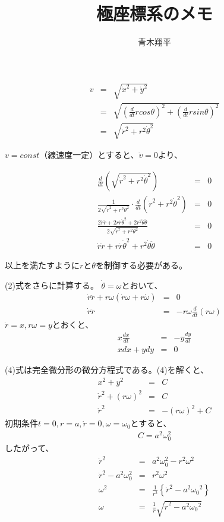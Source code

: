 \documentclass{article}
\title{極座標系のメモ}
\author{青木翔平}
\begin{document}
\maketitle

\begin{eqnarray}
v &=& \sqrt{\dot{x}^2 + \dot{y}^2} \nonumber \\
  &=& \sqrt{ \left(\frac{d}{dt} r cos\theta \right) ^2 + \left(\frac{d}{dt}r sin\theta\right) ^2} \nonumber \\
  &=& \sqrt{ \dot{r}^2+ r^2 \dot{\theta}^2 } 
\end{eqnarray}	
	
$v=const$（線速度一定）とすると、$\dot{v} = 0$より、
	
\begin{eqnarray}
	\frac{d}{dt} \left(\sqrt{ \dot{r}^2+ r^2 \dot{\theta}^2 } \right) &=& 0 \nonumber \\
\frac{1}{2\sqrt{ \dot{r}^2+ r^2 \theta^2 }} \cdot \frac{d}{dt}\left( \dot{r}^2+r^2 \dot{\theta}^2 \right) &=& 0 \nonumber \\ 
\frac{2\dot{r}\ddot{r} + 2r\dot{r}\dot{\theta}^2 + 2r^2\dot{\theta}\ddot{\theta}}{2\sqrt{ \dot{r}^2+ r^2 \theta^2 }} &=& 0 \nonumber \\
\dot{r}\ddot{r} + r\dot{r}\dot{\theta}^2 + r^2\dot{\theta}\ddot{\theta} &=& 0  
\end{eqnarray}
	
以上を満たすように$r$と$\theta$を制御する必要がある。
	
(2)式をさらに計算する。
$\dot{\theta}=\omega$とおいて、
\begin{eqnarray}
  \dot{r}\ddot{r}+r\omega(\dot{r}\omega+r\dot{\omega})&=&0 \nonumber \\
  \dot{r}\ddot{r} &=& -r\omega\frac{d}{dt}(r\omega) 
\end{eqnarray}
$\dot{r}=x, r\omega=y$とおくと、
\begin{eqnarray}
  x\frac{dx}{dt} &=& -y\frac{dy}{dt} \nonumber \\
  xdx + ydy &=& 0	
\end{eqnarray}

(4)式は完全微分形の微分方程式である。(4)を解くと、
\begin{eqnarray}
  x^2+y^2 &=& C  \nonumber \\
  \dot{r}^2 + (r\omega)^2 &=& C \nonumber \\
  \dot{r}^2 &=& -(r\omega)^2 + C 	
\end{eqnarray}
初期条件$t=0, r=a, \dot{r}=0, \omega=\omega_0$とすると、
\begin{eqnarray*}
  C=a^2\omega_0^2	
\end{eqnarray*}
したがって、
\begin{eqnarray}
  \dot{r}^2 &=& a^2 \omega_0^2 - r^2 \omega^2 \nonumber \\
  \dot{r}^2 - a^2 \omega_0^2 &=& r^2 \omega^2 \nonumber \\
  \omega^2 &=& \frac{1}{r^2} \left\{ \dot{r}^2 - a^2 {\omega_0}^2  \right\} \nonumber \\
  \omega &=& \frac{1}{r} \sqrt{ \dot{r}^2 - a^2 {\omega_0}^2 }  
\end{eqnarray}
\end{document}
